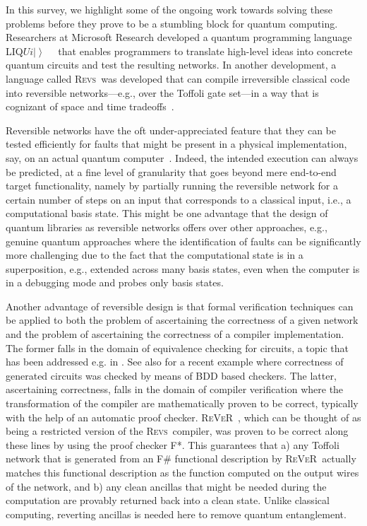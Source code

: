 \documentclass[conference]{IEEEtran}
\newcommand{\ket}[1]{\left| #1\right\rangle}        %
\newcommand{\Liquid}{LIQ$Ui\ket{}$\ }
\newcommand{\REVS}{{\textsc{Revs}}}
\newcommand{\REVER}{{\textsc{ReVeR}}}
\begin{document}
In this survey, we highlight some of the ongoing work towards solving these problems before they prove to be a stumbling block for quantum computing. Researchers at Microsoft Research developed a quantum programming language \Liquid~\cite{WS:2014} that enables programmers to translate high-level ideas into concrete quantum circuits and test the resulting networks. In another development, a language called \REVS~was developed that can compile irreversible classical code into reversible networks---e.g., over the Toffoli gate set---in a way that is cognizant of space and time tradeoffs~\cite{PRS15}. 

Reversible networks have the oft under-appreciated feature that they can be tested efficiently for faults that might be present in a physical implementation, say, on an actual quantum computer~\cite{HRS16}. Indeed, the intended execution can always be predicted, at a fine level of granularity that goes beyond mere end-to-end target functionality, namely by partially running the reversible network for a certain number of steps on an input that corresponds to a classical input, i.e., a computational basis state. This might be one advantage that the design of quantum libraries as reversible networks offers over other approaches, e.g., genuine quantum approaches where the identification of faults can be significantly more challenging due to the fact that the computational state is in a superposition, e.g., extended across many basis states, even when the computer is in a debugging mode and probes only basis states. 

Another advantage of reversible design is that formal verification techniques can be applied to both the problem of ascertaining the correctness of a given network and the problem of ascertaining the correctness of a compiler implementation. The former falls in the domain of equivalence checking for circuits, a topic that has been addressed e.g. in \cite{VMH:2007}. See also \cite{SRWD:2017} for a recent example where correctness of generated circuits was checked by means of BDD based checkers.  The latter, ascertaining correctness, falls in the domain of compiler verification where the transformation of the compiler are mathematically proven to be correct, typically with the help of an automatic proof checker. \REVER~\cite{ARS16}, which can be thought of as being a restricted version of the \REVS~compiler, was proven to be correct along these lines by using the proof checker F*.  This guarantees that a) any Toffoli network that is generated from an F\# functional description by \REVER~actually matches this functional description as the function computed on the output wires of the network, and b) any clean ancillas that might be needed during the computation are provably returned back into a clean state. Unlike classical computing, reverting ancillas is needed here to remove quantum entanglement.
\end{document}
